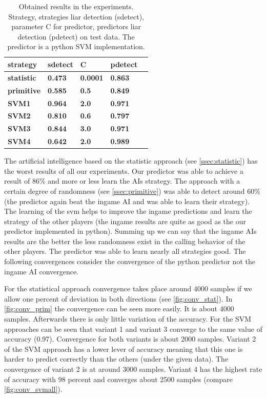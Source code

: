 \documentclass[11pt]{article}
\begin{document}
\begin{table}[H]
\centering
\small
\begin{tabular}{|l|l|l|l|l|}
\hline
\textbf{strategy}&\textbf{sdetect}&\textbf{C}&\textbf{pdetect} \\ \hline
\textbf{statistic}&\textbf{0.473}&\textbf{0.0001}&\textbf{0.863} \\ \hline
\textbf{primitive}&\textbf{0.585}&\textbf{0.5}&\textbf{0.849} \\ \hline
\textbf{SVM1}&\textbf{0.964}&\textbf{2.0}&\textbf{0.971} \\ \hline
\textbf{SVM2}&\textbf{0.810}&\textbf{0.6}&\textbf{0.797}\\ \hline 
\textbf{SVM3}&\textbf{0.844}&\textbf{3.0}&\textbf{0.971}\\ \hline 
\textbf{SVM4}&\textbf{0.642}&\textbf{2.0}&\textbf{0.989} \\ \hline
\end{tabular}
\caption{Obtained results in the experiments. Strategy, strategies liar detection (sdetect), parameter C for predictor, predictors liar detection (pdetect) on test data. The predictor is a python SVM implementation.}
\label{tab:results}
\end{table}

The artificial intelligence based on the statistic approach (see \cref{ssec:statistic}) has the worst results of all our experiments. Our predictor was able to achieve a result of 86\% and more or less learn the AIs strategy.
The approach with a certain degree of randomness (see \cref{ssec:primitive}) was able to detect around 60\% (the predictor again beat the ingame AI and was able to learn their strategy).
The learning of the svm helps to improve the ingame predictions and learn the strategy of the other players (the ingame results are quite as good as the our predictor implemented in python).
Summing up we can say that the ingame AIs results are the better the less randomness exist in the calling behavior of the other players.
The predictor was able to learn nearly all strategies good.
The following convergences consider the convergence of the python predictor not the ingame AI convergence.

For the statistical approach convergence takes place around 4000 samples if we allow one percent of deviation in both directions (see \cref{fig:conv_stat}). 
In \cref{fig:conv_prim} the convergence can be seen more easily. It is about 4000 samples. Afterwards there is only little variation of the accuracy. 
For the SVM approaches can be seen that variant 1 and variant 3 converge to the same value of accuracy (0.97). Convergence for both variants is about 2000 samples. Variant 2 of the SVM approach has a lower lever of accuracy meaning that this one is harder to predict correctly than the others (under the given data). The convergence of variant 2 is at around 3000 samples. Variant 4 has the highest rate of accuracy with 98 percent and converges about 2500 samples (compare \cref{fig:conv_svmall}).
\end{document}
